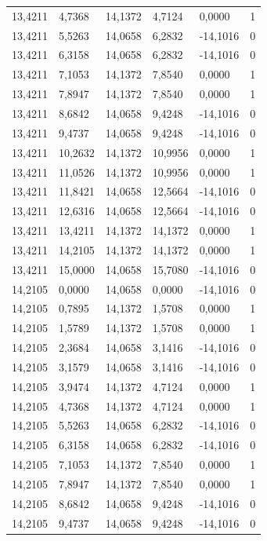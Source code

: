 \documentclass[12pt]{article}
\begin{document}
\begin{longtable}{@{}llllll@{}}
		13,4211 & 4,7368  & 14,1372 & 4,7124  & 0,0000   & 1  \\
		13,4211 & 5,5263  & 14,0658 & 6,2832  & -14,1016 & 0  \\
		13,4211 & 6,3158  & 14,0658 & 6,2832  & -14,1016 & 0  \\
		13,4211 & 7,1053  & 14,1372 & 7,8540  & 0,0000   & 1  \\
		13,4211 & 7,8947  & 14,1372 & 7,8540  & 0,0000   & 1  \\
		13,4211 & 8,6842  & 14,0658 & 9,4248  & -14,1016 & 0  \\
		13,4211 & 9,4737  & 14,0658 & 9,4248  & -14,1016 & 0  \\
		13,4211 & 10,2632 & 14,1372 & 10,9956 & 0,0000   & 1  \\
		13,4211 & 11,0526 & 14,1372 & 10,9956 & 0,0000   & 1  \\
		13,4211 & 11,8421 & 14,0658 & 12,5664 & -14,1016 & 0  \\
		13,4211 & 12,6316 & 14,0658 & 12,5664 & -14,1016 & 0  \\
		13,4211 & 13,4211 & 14,1372 & 14,1372 & 0,0000   & 1  \\
		13,4211 & 14,2105 & 14,1372 & 14,1372 & 0,0000   & 1  \\
		13,4211 & 15,0000 & 14,0658 & 15,7080 & -14,1016 & 0  \\
		14,2105 & 0,0000  & 14,0658 & 0,0000  & -14,1016 & 0  \\
		14,2105 & 0,7895  & 14,1372 & 1,5708  & 0,0000   & 1  \\
		14,2105 & 1,5789  & 14,1372 & 1,5708  & 0,0000   & 1  \\
		14,2105 & 2,3684  & 14,0658 & 3,1416  & -14,1016 & 0  \\
		14,2105 & 3,1579  & 14,0658 & 3,1416  & -14,1016 & 0  \\
		14,2105 & 3,9474  & 14,1372 & 4,7124  & 0,0000   & 1  \\
		14,2105 & 4,7368  & 14,1372 & 4,7124  & 0,0000   & 1  \\
		14,2105 & 5,5263  & 14,0658 & 6,2832  & -14,1016 & 0  \\
		14,2105 & 6,3158  & 14,0658 & 6,2832  & -14,1016 & 0  \\
		14,2105 & 7,1053  & 14,1372 & 7,8540  & 0,0000   & 1  \\
		14,2105 & 7,8947  & 14,1372 & 7,8540  & 0,0000   & 1  \\
		14,2105 & 8,6842  & 14,0658 & 9,4248  & -14,1016 & 0  \\
		14,2105 & 9,4737  & 14,0658 & 9,4248  & -14,1016 & 0  \\

\end{longtable}
\end{document}

